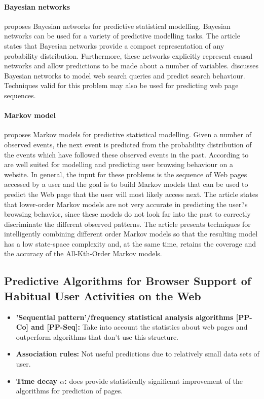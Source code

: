 \documentclass[a4paper,11pt]{article}
\begin{document}
\paragraph{Bayesian networks} \cite{predictive-statistical-models} proposes Bayesian networks for predictive statistical modelling. Bayesian networks can be used for a variety of predictive modelling tasks. The article states that Bayesian networks provide a compact representation of any probability distribution. Furthermore, these networks explicitly represent causal networks and allow predictions to be made about a number of variables. \cite{search-prediction} discusses Bayesian networks to model web search queries and predict search behaviour. Techniques valid for this problem may also be used for predicting web page sequences.

\paragraph{Markov model} \cite{predictive-statistical-models} proposes Markov models for predictive statistical modelling. Given a number of observed events, the next event is predicted from the probability distribution of the events which have followed these observed events in the past. According to \cite{markov-web-page-accesses} are well suited for modelling and predicting user browsing behaviour on a website. In general, the input for these problems is the sequence of Web pages accessed by a user and the goal is to build Markov models that can be used to predict the Web page that the user will most likely access next. The article states that lower-order Markov models are not very accurate in predicting the user?s browsing behavior, since these models do not look far into the past to correctly discriminate the different observed patterns. The article presents techniques for intelligently combining different order Markov models so that the resulting model has a low state-space complexity and, at the same time, retains the coverage and the accuracy of the All-Kth-Order Markov models.


\subsection{Predictive Algorithms for Browser Support of Habitual User Activities on the Web}
\begin{itemize}
	\item \textbf{'Sequential pattern'/frequency statistical analysis algorithms [PP-Co] and [PP-Seq]:} Take into account the statistics about web pages and outperform algorithms that don't use this structure.
	\item \textbf{Association rules:} Not useful predictions due to relatively small data sets of user.
	\item \textbf{Time decay $\alpha$:} does provide statistically significant improvement of the algorithms for prediction of pages.
\end{itemize}
\end{document}
